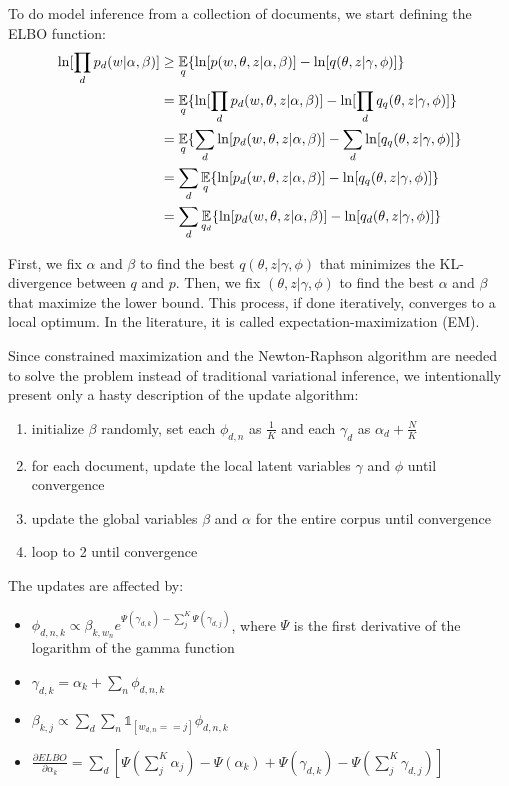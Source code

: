 To do model inference from a collection of documents, we start defining the ELBO function:
\begin{equation*}
    \begin{split}
        \ln[\prod_d p_d(w | \alpha, \beta)] & \geq
        \operatorname*{\mathbb{E}}_q \{ \ln[p(w, \theta, z | \alpha, \beta)] - \ln[q(\theta, z | \gamma, \phi)] \} \\
        & = \operatorname*{\mathbb{E}}_q \{ \ln[\prod_d p_d(w, \theta, z | \alpha, \beta)] - \ln[ \prod_d q_q(\theta, z | \gamma, \phi)] \} \\
        & = \operatorname*{\mathbb{E}}_q \{ \sum_d \ln[p_d(w, \theta, z | \alpha, \beta)] - \sum_d \ln[q_q(\theta, z | \gamma, \phi)] \} \\
        & = \sum_d \operatorname*{\mathbb{E}}_q \{ \ln[p_d(w, \theta, z | \alpha, \beta)] - \ln[q_q(\theta, z | \gamma, \phi)] \} \\
        & = \sum_d \operatorname*{\mathbb{E}}_{q_d} \{ \ln[p_d(w, \theta, z | \alpha, \beta)] - \ln[q_d(\theta, z | \gamma, \phi)] \} \\
    \end{split}
\end{equation*}

First, we fix $\alpha$ and $\beta$ to find the best $q(\theta, z | \gamma, \phi)$ that minimizes the KL-divergence between $q$ and $p$.
Then, we fix $(\theta, z | \gamma, \phi)$ to find the best $\alpha$ and $\beta$ that maximize the lower bound.
This process, if done iteratively, converges to a local optimum.
In the literature, it is called expectation-maximization (EM).

Since constrained maximization and
the Newton-Raphson algorithm are needed to solve the problem
instead of traditional variational inference,
we intentionally present only a hasty description of the update algorithm:
\begin{enumerate}
    \item initialize $\beta$ randomly, set each $\phi_{d,n}$ as $\frac{1}{K}$ and each $\gamma_d$ as $\alpha_d + \frac{N}{K}$
    \item for each document, update the local latent variables $\gamma$ and $\phi$ until convergence
    \item update the global variables $\beta$ and $\alpha$ for the entire corpus until convergence
    \item loop to 2 until convergence
\end{enumerate}

The updates are affected by:
\begin{itemize}
    \item $\phi_{d,n,k} \propto \beta_{k, w_n} e^{\Psi(\gamma_{d,k}) - \sum_j^K \Psi(\gamma_{d,j})}$, where $\Psi$ is the first derivative of the logarithm of the gamma function
    \item $\gamma_{d,k} = \alpha_k + \sum_n \phi_{d,n,k}$
    \item $\beta_{k,j} \propto \sum_d \sum_n \mathbb{1}_{[w_{d,n} == j]} \phi_{d,n,k}$
    \item $\frac{\partial \mathit{ELBO}}{ \partial \alpha_k} = \sum_d [ \Psi(\sum_j^K \alpha_j) - \Psi(\alpha_k) + \Psi(\gamma_{d,k}) - \Psi(\sum_j^K \gamma_{d,j})]$
\end{itemize}

